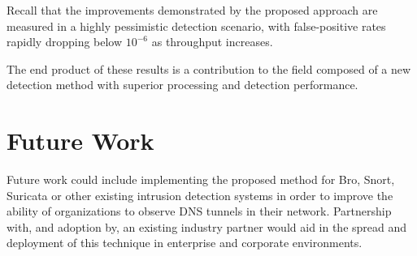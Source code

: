 \documentclass{llncs}
\begin{document}
%
%
Recall that the improvements demonstrated by the proposed approach are 
measured in a highly pessimistic detection scenario, with false-positive rates
rapidly dropping below $10^{-6}$ as throughput increases.

The end product of these results is a contribution to the field composed of a new
detection method with superior processing and detection performance.

\section{Future Work}


Future work could include implementing the proposed method for Bro, Snort,
Suricata or other existing intrusion detection systems in order to improve
the ability of organizations to observe DNS tunnels in their network. Partnership with, and
adoption by, an existing industry partner would aid in the spread and deployment of
this technique in enterprise and corporate environments.


\end{document}
